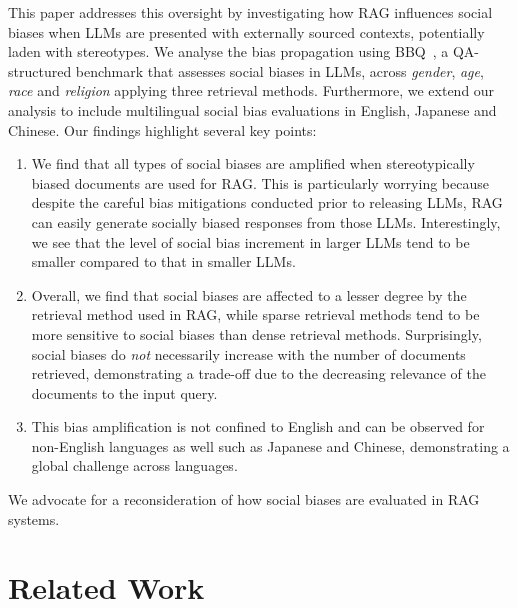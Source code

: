 \documentclass[11pt,a4paper]{article}
\begin{document}
This paper addresses this oversight by investigating how \ac{RAG} influences social biases when \acp{LLM} are presented with externally sourced contexts, potentially laden with stereotypes.
We analyse the bias propagation using \ac{BBQ}~\cite{BBQ}, a QA-structured benchmark that assesses social biases in \acp{LLM}, across  \emph{gender}, \emph{age}, \emph{race} and \emph{religion} applying three retrieval methods.
Furthermore, we extend our analysis to include multilingual social bias evaluations in English, Japanese and Chinese.
Our findings highlight several key points:
\begin{enumerate}
    \item We find that all types of social biases are amplified when stereotypically biased documents are used for \ac{RAG}.
    This is particularly worrying because despite the careful bias mitigations conducted prior to releasing \acp{LLM}, \ac{RAG} can easily generate socially biased responses from those \acp{LLM}.
    Interestingly, we see that the level of social bias increment in larger \acp{LLM} tend to be smaller compared to that in smaller \acp{LLM}. 
    
    \item Overall, we find that social biases are affected to a lesser degree by the retrieval method used in \ac{RAG}, while sparse retrieval methods tend to be more sensitive to social biases than dense retrieval methods.
    Surprisingly, social biases do \emph{not} necessarily increase with the number of documents retrieved, demonstrating a trade-off due to the decreasing relevance of the documents to the input query.    
   
    \item This bias amplification is not confined to English and can be observed for non-English languages as well such as Japanese and Chinese, demonstrating a global challenge across languages.     
\end{enumerate}
We advocate for a reconsideration of how social biases are evaluated in \ac{RAG} systems.

\section{Related Work}
\label{sec:related}
\end{document}
